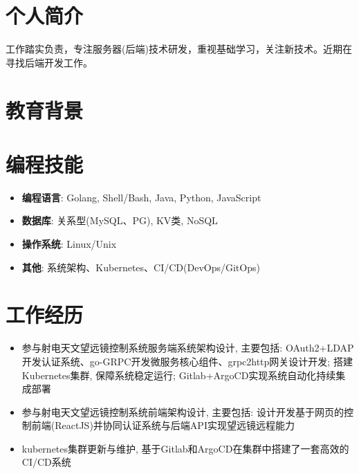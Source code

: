 \documentclass{resume}
\begin{document}


 
\section{个人简介}
工作踏实负责，专注服务器(后端)技术研发，重视基础学习，关注新技术。近期在寻找后端开发工作。
\section{教育背景}
\section{编程技能}
\begin{itemize}[parsep=0.2ex]
  \item \textbf{编程语言}: Golang, Shell/Bash, Java, Python, JavaScript
  \item \textbf{数据库}: 关系型(MySQL、PG), KV类, NoSQL
  \item \textbf{操作系统}: Linux/Unix
  \item \textbf{其他}: 系统架构、Kubernetes、CI/CD(DevOps/GitOps)
\end{itemize}


\section{工作经历}
\begin{itemize}
  \item 参与射电天文望远镜控制系统服务端系统架构设计, 主要包括: OAuth2+LDAP开发认证系统、go-GRPC开发微服务核心组件、grpc2http网关设计开发; 搭建Kubernetes集群, 保障系统稳定运行; Gitlab+ArgoCD实现系统自动化持续集成部署
  \item 参与射电天文望远镜控制系统前端架构设计, 主要包括: 设计开发基于网页的控制前端(ReactJS)并协同认证系统与后端API实现望远镜远程能力
  \item kubernetes集群更新与维护, 基于Gitlab和ArgoCD在集群中搭建了一套高效的CI/CD系统
\end{itemize}
\end{document}
